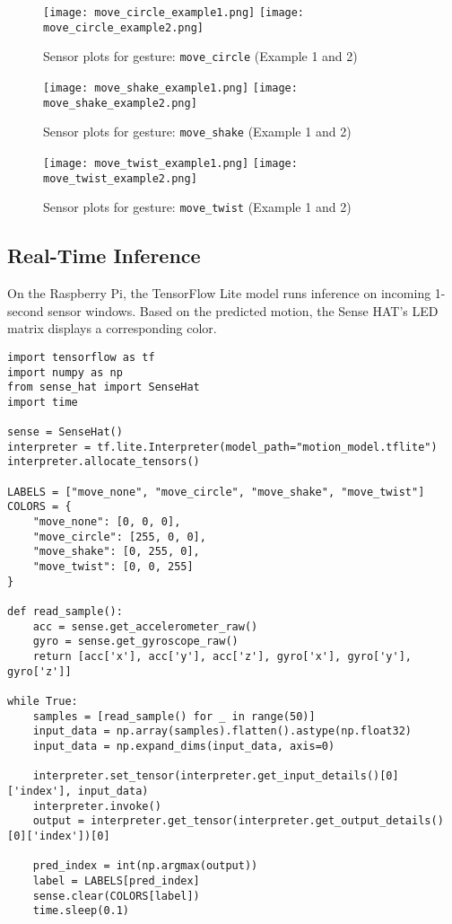 \documentclass[a4paper,12pt]{article}
\begin{document}
\begin{figure}[h!]
\centering
\texttt{[image: move\_circle\_example1.png]}
\hfill
\texttt{[image: move\_circle\_example2.png]}
\caption{Sensor plots for gesture: \texttt{move\_circle} (Example 1 and 2)}
\end{figure}

\begin{figure}[h!]
\centering
\texttt{[image: move\_shake\_example1.png]}
\hfill
\texttt{[image: move\_shake\_example2.png]}
\caption{Sensor plots for gesture: \texttt{move\_shake} (Example 1 and 2)}
\end{figure}

\begin{figure}[h!]
\centering
\texttt{[image: move\_twist\_example1.png]}
\hfill
\texttt{[image: move\_twist\_example2.png]}
\caption{Sensor plots for gesture: \texttt{move\_twist} (Example 1 and 2)}
\end{figure}

\subsection*{Real-Time Inference}

On the Raspberry Pi, the TensorFlow Lite model runs inference on incoming 1-second sensor windows. Based on the predicted motion, the Sense HAT’s LED matrix displays a corresponding color.

\begin{lstlisting}
import tensorflow as tf
import numpy as np
from sense_hat import SenseHat
import time

sense = SenseHat()
interpreter = tf.lite.Interpreter(model_path="motion_model.tflite")
interpreter.allocate_tensors()

LABELS = ["move_none", "move_circle", "move_shake", "move_twist"]
COLORS = {
    "move_none": [0, 0, 0],
    "move_circle": [255, 0, 0],
    "move_shake": [0, 255, 0],
    "move_twist": [0, 0, 255]
}

def read_sample():
    acc = sense.get_accelerometer_raw()
    gyro = sense.get_gyroscope_raw()
    return [acc['x'], acc['y'], acc['z'], gyro['x'], gyro['y'], gyro['z']]

while True:
    samples = [read_sample() for _ in range(50)]
    input_data = np.array(samples).flatten().astype(np.float32)
    input_data = np.expand_dims(input_data, axis=0)

    interpreter.set_tensor(interpreter.get_input_details()[0]['index'], input_data)
    interpreter.invoke()
    output = interpreter.get_tensor(interpreter.get_output_details()[0]['index'])[0]

    pred_index = int(np.argmax(output))
    label = LABELS[pred_index]
    sense.clear(COLORS[label])
    time.sleep(0.1)
\end{lstlisting}
\end{document}
